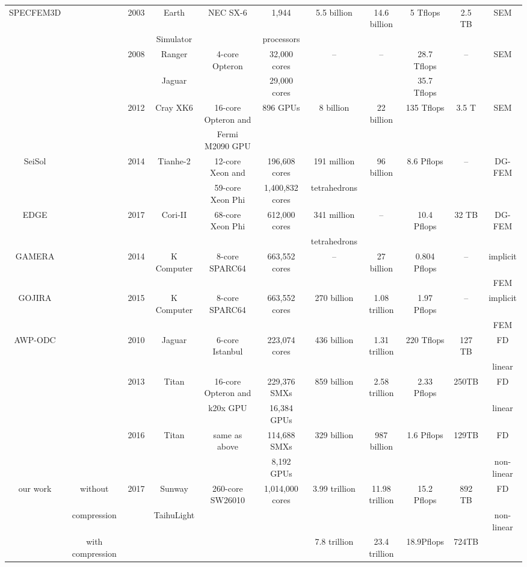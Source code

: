 \documentclass[degree=doctor]{thuthesis}
\begin{document}
\begin{landscape}
\begin{table}[p]
{\begin{tabular}{ccccccccccc}
  SPECFEM3D & \citep{es-gb-2003} & 2003 & Earth  & NEC SX-6 & 1,944 & 5.5 billion & 14.6 billion & 5 Tflops & 2.5 TB & SEM  \\
  &&&Simulator&& processors &&&& \\\cline{2-11}
   & \citep{carrington2008high} & 2008 & Ranger & 4-core Opteron & 32,000 cores & -- & -- & 28.7 Tflops & -- & SEM \\
  & & & Jaguar &  & 29,000 cores & & & 35.7 Tflops & & \\\cline{2-11}
  & \citep{rietmann2012forward} & 2012 & Cray XK6 & 16-core Opteron and & 896 GPUs & 8 billion & 22 billion & 135 Tflops & 3.5 T & SEM \\
  &&&& Fermi M2090 GPU &&&&&& \\\hline\hline
  SeiSol & \citep{tianhe2-2014gb} & 2014 & Tianhe-2 & 12-core Xeon and & 196,608 cores & 191 million & 96 billion & 8.6 Pflops & -- & DG-FEM \\
  &&&& 59-core Xeon Phi & 1,400,832  cores &  tetrahedrons &&&& \\\cline{2-11}
  EDGE & \citep{breuer2017edge} & 2017 & Cori-II & 68-core Xeon Phi & 612,000 cores & 341 million & -- & 10.4 Pflops & 32 TB & DG-FEM \\
  &&&&&  &  tetrahedrons &&&& \\\hline\hline
  GAMERA & \citep{ichimura2014physics} & 2014 & K Computer & 8-core SPARC64 & 663,552 cores & -- & 27 billion  & 0.804 Pflops & -- & implicit \\
  &&&&&  &  &&&& FEM \\\cline{2-11}
  GOJIRA & \citep{ichimura2015implicit} & 2015 & K Computer & 8-core SPARC64 & 663,552 cores & 270 billion & 1.08 trillion  & 1.97 Pflops & -- & implicit \\
  &&&&& &  &&&& FEM \\\hline\hline
  AWP-ODC & \citep{cui2010scalable} & 2010 & Jaguar & 6-core Istanbul & 223,074 cores & 436 billion & 1.31 trillion & 220 Tflops & 127 TB & FD \\
  &&&&&  &  &&&& linear\\\cline{2-11}
  & \citep{cui2013physics} & 2013 & Titan & 16-core Opteron and & 229,376 SMXs & 859 billion & 2.58 trillion & 2.33 Pflops & 250TB & FD  \\
  &&&&k20x GPU & 16,384 GPUs &  &&&& linear\\\cline{2-11}
  & \citep{roten2016high} & 2016 & Titan & same as above & 114,688 SMXs & 329 billion & 987 billion & 1.6 Pflops & 129TB & FD \\
 &&&&&  8,192 GPUs &  &&&& non-linear \\\hline\hline
 our work & without & 2017 & Sunway & 260-core SW26010 & 1,014,000 cores & 3.99 trillion & 11.98 trillion & 15.2 Pflops & 892 TB & FD \\
 &compression&&TaihuLight&& &  &&&& non-linear \\
 & with compression &  &  &  & & 7.8 trillion & 23.4 trillion &  18.9Pflops & 724TB & \\\hline\hline
\end{tabular}
}
\end{table}
\end{landscape}
\end{document}
